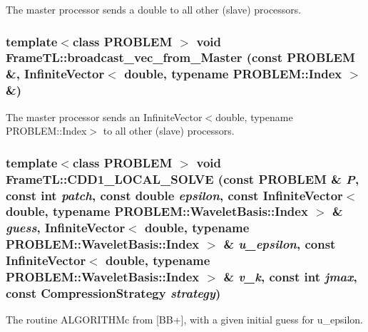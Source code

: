 The master processor sends a double to all other (slave) processors. \hypertarget{namespaceFrameTL_99afa22a98a5b20d8326b2983bb19088}{
\subsubsection[{broadcast\_\-vec\_\-from\_\-Master}]{\setlength{\rightskip}{0pt plus 5cm}template$<$class PROBLEM $>$ void FrameTL::broadcast\_\-vec\_\-from\_\-Master (const PROBLEM \&, \/  InfiniteVector$<$ double, typename PROBLEM::Index $>$ \&)}}
\label{namespaceFrameTL_99afa22a98a5b20d8326b2983bb19088}


The master processor sends an InfiniteVector$<$double, typename PROBLEM::Index$>$ to all other (slave) processors. \hypertarget{namespaceFrameTL_8a92efb82d1634c8cf05737d5164b731}{
\subsubsection[{CDD1\_\-LOCAL\_\-SOLVE}]{\setlength{\rightskip}{0pt plus 5cm}template$<$class PROBLEM $>$ void FrameTL::CDD1\_\-LOCAL\_\-SOLVE (const PROBLEM \& {\em P}, \/  const int {\em patch}, \/  const double {\em epsilon}, \/  const InfiniteVector$<$ double, typename PROBLEM::WaveletBasis::Index $>$ \& {\em guess}, \/  InfiniteVector$<$ double, typename PROBLEM::WaveletBasis::Index $>$ \& {\em u\_\-epsilon}, \/  const InfiniteVector$<$ double, typename PROBLEM::WaveletBasis::Index $>$ \& {\em v\_\-k}, \/  const int {\em jmax}, \/  const CompressionStrategy {\em strategy})}}
\label{namespaceFrameTL_8a92efb82d1634c8cf05737d5164b731}


The routine ALGORITHMc from \mbox{[}BB+\mbox{]}, with a given initial guess for u\_\-epsilon. 

